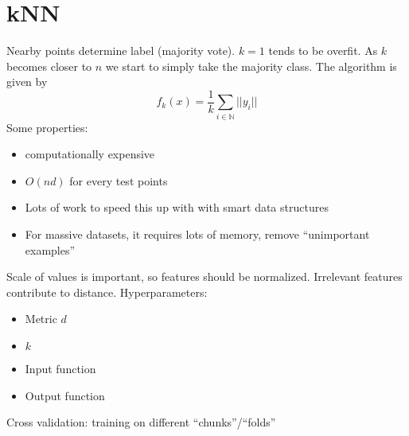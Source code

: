 \documentclass{article}
\theoremstyle{definition}
\begin{document}
\section*{kNN}
    Nearby points determine label (majority vote). $k=1$ tends to be overfit. As $k$ becomes closer to $n$ 
    we start to simply take the majority class. The algorithm is given by 
    \[
        f_k(x) = \frac{1}{k}\sum_{i \in \mathbb{N}}||y_i||
    \]
    Some properties:
    \begin{itemize}
        \item computationally expensive
        \item $O(nd)$ for every test points
        \item Lots of work to speed this up with with smart data structures
        \item For massive datasets, it requires lots of memory, remove ``unimportant examples''
    \end{itemize}
Scale of values is important, so features should be normalized.
Irrelevant features contribute to distance.
Hyperparameters:
\begin{itemize}
    \item Metric $d$
    \item $k$
    \item Input function
    \item Output function
\end{itemize}
Cross validation: training on different ``chunks''/``folds''
\end{document}
